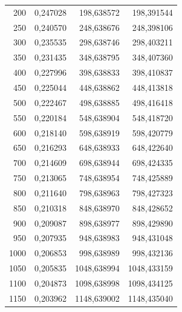 \begin{table}[htbp]
\begin{tabular}{rrrr}
       200 &   0,247028 & 198,638572 & 198,391544 \\

       250 &   0,240570 & 248,638676 & 248,398106 \\

       300 &   0,235535 & 298,638746 & 298,403211 \\

       350 &   0,231435 & 348,638795 & 348,407360 \\

       400 &   0,227996 & 398,638833 & 398,410837 \\

       450 &   0,225044 & 448,638862 & 448,413818 \\

       500 &   0,222467 & 498,638885 & 498,416418 \\

       550 &   0,220184 & 548,638904 & 548,418720 \\

       600 &   0,218140 & 598,638919 & 598,420779 \\

       650 &   0,216293 & 648,638933 & 648,422640 \\

       700 &   0,214609 & 698,638944 & 698,424335 \\

       750 &   0,213065 & 748,638954 & 748,425889 \\

       800 &   0,211640 & 798,638963 & 798,427323 \\

       850 &   0,210318 & 848,638970 & 848,428652 \\

       900 &   0,209087 & 898,638977 & 898,429890 \\

       950 &   0,207935 & 948,638983 & 948,431048 \\

      1000 &   0,206853 & 998,638989 & 998,432136 \\

      1050 &   0,205835 & 1048,638994 & 1048,433159 \\

      1100 &   0,204873 & 1098,638998 & 1098,434125 \\

      1150 &   0,203962 & 1148,639002 & 1148,435040 \\


\end{tabular}
\end{table}
